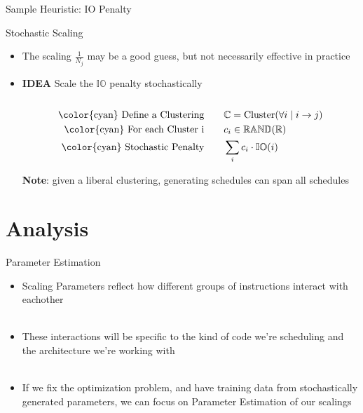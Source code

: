 \documentclass{beamer}
\begin{document}
\begin{darkframes}
\begin{frame}{Sample Heuristic: IO Penalty}
\begin{itemize}
      \end{itemize}
    \end{frame}

    \begin{frame}{Stochastic Scaling}

      \begin{itemize}
      \item The scaling $\frac{1}{N_j}$ may be a good \alert{guess}, but not
        necessarily effective in practice
      \item {\bf \color{green} IDEA} Scale the $\mathbb{IO}$ penalty
        stochastically \\
        \qquad \\

        
        \begin{align*}
          \text{\color{cyan} Define a Clustering} \qquad & \mathbb{C} = \text{Cluster}(\forall i \mid i \rightarrow j) \\
          \text{\color{cyan} For each Cluster i} \qquad & c_i \in \mathbb{RAND(R)} \\
          \text{\color{cyan} Stochastic Penalty} \qquad & \sum_i c_i \cdot \mathbb{IO}(i)
        \end{align*}

         {\bf \color{green} Note}: given a liberal clustering, generating schedules can \alert{span all schedules}
      \end{itemize}
    \end{frame}

    \section{Analysis}
    \begin{frame}{Parameter Estimation}

      \begin{itemize}
      \item \alert{Scaling Parameters} reflect how different
        groups of instructions interact with eachother \\
        \qquad \\
      \item These interactions will be specific to the kind of code we're
        scheduling and the architecture we're working with \\
        \qquad \\
      \item If we fix the optimization problem, and have \alert{ training
          data} from stochastically generated parameters, we can focus on
        \alert{Parameter Estimation} of our scalings
      \end{itemize}
    \end{frame}


\end{darkframes}
\end{document}
